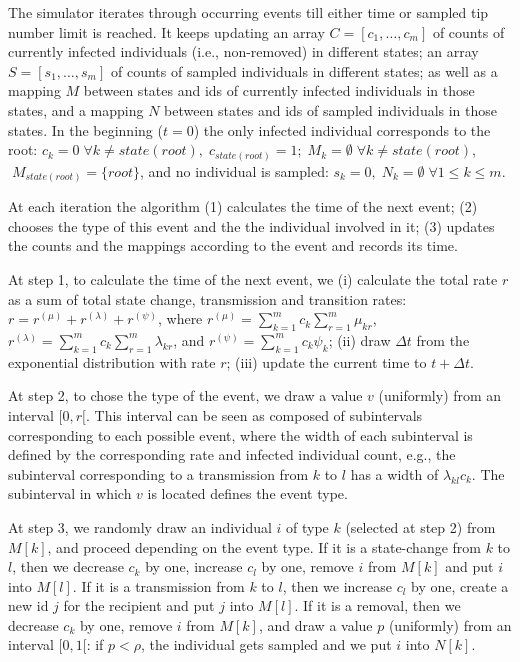 \documentclass[10pt,letterpaper]{article}
\begin{document}
The simulator iterates through occurring events till either time or sampled tip number limit is reached. 
It keeps updating an array $C = [c_1, \ldots, c_m]$ of counts of currently infected individuals (i.e., non-removed) in different states; an array $S = [s_1, \ldots, s_m]$ of counts of sampled individuals in different states; as well as a mapping $M$ between states and ids of currently infected individuals in those states, and a mapping $N$ between states and ids of sampled individuals in those states.  In the beginning ($t=0$) the only infected individual corresponds to the root: $c_k = 0 \;\forall k \neq state(root), \;c_{state(root)} = 1; \;M_k = \emptyset \; \forall k \neq state(root)$, $ \; M_{state(root)} = \{root\}$, and no individual is sampled: $s_k=0,\;N_k = \emptyset \; \forall 1 \leq k \leq m$.

At each iteration the algorithm (1) calculates the time of the next event; (2) chooses the type of this event and the the individual involved in it; (3) updates the counts and the mappings according to the event and records its time.

At step 1, to calculate the time of the next event, we (i) calculate the total rate $r$ as a sum of total state change, transmission and transition rates: $r = r^{(\mu)} + r^{(\lambda)} + r^{(\psi)}$, where $r^{(\mu)} = \sum\limits_{k=1}^{m} c_k \sum\limits_{r=1}^{m} \mu_{kr}$, $r^{(\lambda)} = \sum\limits_{k=1}^{m} c_k \sum\limits_{r=1}^{m} \lambda_{kr}$, and $r^{(\psi)} = \sum\limits_{k=1}^{m} c_k \psi_{k}$; (ii) draw $\Delta t$ from the exponential distribution with rate $r$; (iii) update the current time to $t + \Delta t$.

At step 2, to chose the type of the event, we draw a value $v$ (uniformly) from an interval $[0, r[$. This interval can be seen as composed of subintervals corresponding to each possible event, where the width of each subinterval is defined by the corresponding rate and infected individual count, e.g., the subinterval corresponding to a transmission from $k$ to $l$ has a width of $\lambda_{kl}c_k$. The subinterval in which $v$ is located defines the event type.

At step 3, we randomly draw an individual $i$ of type $k$ (selected at step 2) from $M[k]$, and proceed depending on the event type. If it is a state-change from $k$ to $l$, then we decrease $c_k$ by one, increase $c_l$ by one, remove $i$ from $M[k]$ and put $i$ into $M[l]$. If it is a transmission from $k$ to $l$, then we increase $c_l$ by one, create a new id $j$ for the recipient and put $j$ into $M[l]$. If it is a removal, then we decrease $c_k$ by one, remove $i$ from $M[k]$, and draw a value $p$ (uniformly) from an interval $[0, 1[$: if $p < \rho$, the individual gets sampled and we put $i$ into $N[k]$. 
\end{document}
